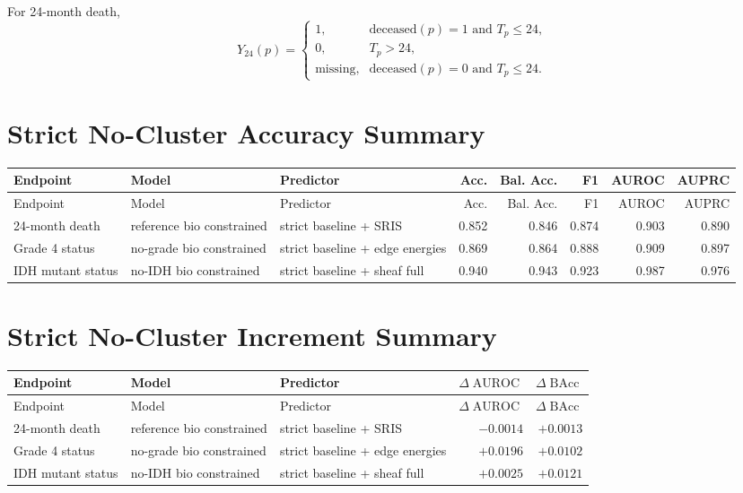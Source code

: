 \documentclass[11pt]{article}
\newcommand{\AUC}{\operatorname{AUROC}}
\newcommand{\BAcc}{\operatorname{BAcc}}
\begin{document}
For 24-month death,
\[
Y_{24}(p)=
\begin{cases}
1,&\text{deceased}(p)=1\text{ and }T_p\le24,\\
0,&T_p>24,\\
\text{missing},&\text{deceased}(p)=0\text{ and }T_p\le24.
\end{cases}
\]

\section{Strict No-Cluster Accuracy Summary}

\begin{longtable}{p{2.7cm}p{3.0cm}p{3.3cm}rrrrr}
\toprule
Endpoint & Model & Predictor & Acc. & Bal. Acc. & F1 & AUROC & AUPRC\\
\midrule
\endfirsthead
\toprule
Endpoint & Model & Predictor & Acc. & Bal. Acc. & F1 & AUROC & AUPRC\\
\midrule
\endhead
24-month death & reference bio constrained & strict baseline + SRIS & 0.852 & 0.846 & 0.874 & 0.903 & 0.890\\
Grade 4 status & no-grade bio constrained & strict baseline + edge energies & 0.869 & 0.864 & 0.888 & 0.909 & 0.897\\
IDH mutant status & no-IDH bio constrained & strict baseline + sheaf full & 0.940 & 0.943 & 0.923 & 0.987 & 0.976\\
\bottomrule
\end{longtable}

\section{Strict No-Cluster Increment Summary}

\begin{longtable}{p{3cm}p{3.1cm}p{3.4cm}rr}
\toprule
Endpoint & Model & Predictor & $\Delta\AUC$ & $\Delta\BAcc$\\
\midrule
\endfirsthead
\toprule
Endpoint & Model & Predictor & $\Delta\AUC$ & $\Delta\BAcc$\\
\midrule
\endhead
24-month death & reference bio constrained & strict baseline + SRIS & $-0.0014$ & $+0.0013$\\
Grade 4 status & no-grade bio constrained & strict baseline + edge energies & $+0.0196$ & $+0.0102$\\
IDH mutant status & no-IDH bio constrained & strict baseline + sheaf full & $+0.0025$ & $+0.0121$\\
\bottomrule
\end{longtable}
\end{document}
